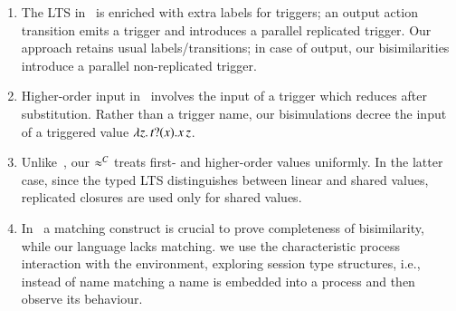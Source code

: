 \begin{enumerate}[$\bullet$]
\item 
The LTS in~\cite{JeffreyR05} is enriched with extra labels for triggers;
an output action transition emits a trigger and introduces a parallel replicated trigger.
Our 
approach retains usual labels/transitions; in  case of output,
our bisimilarities introduce a parallel
non-replicated trigger.
\item Higher-order input in~\cite{JeffreyR05} involves 
the input of a trigger which reduces after substitution.
Rather than a trigger name, our bisimulations  
decree the input of a triggered value $\lambda z.\,t ? (x) . x\, {z}$.
\item Unlike~\cite{JeffreyR05}, 
our $\approx^C$ treats  
first- and higher-order values uniformly. In the latter case, 
since the typed LTS distinguishes between linear and shared values, 
replicated closures are used only for shared values.

\item In~\cite{JeffreyR05} a matching construct is
crucial to prove completeness of bisimilarity,
while our language lacks matching. 
we use the characteristic
process interaction with the environment, exploring 
session type structures, i.e., instead of
name matching a name is embedded into a process and then observe its behaviour.


\end{enumerate}

